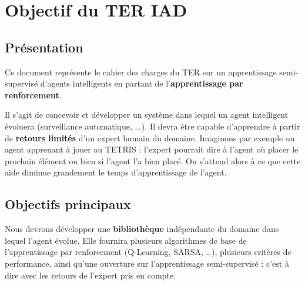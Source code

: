 \documentclass[a4paper,12pt]{article}
\begin{document}
  \begin{titlepage}
   \def\titletype{Cahier des charges}
   
  \end{titlepage}

  
  \clearpage

  \tableofcontents
  

  \clearpage
  
  \renewcommand{\labelitemi}{$\bullet$}
  \renewcommand{\labelitemii}{$\circ$}
  \renewcommand{\labelitemiii}{$\diamond$}
  \renewcommand{\labelitemiv}{$\ast$}
  
  \section{Objectif du TER IAD}
  \subsection{Présentation}
    Ce document représente le cahier des charges du TER sur un apprentissage semi-supervisé d'agents intelligents 
    en partant de l'\textbf{apprentissage par renforcement}.
	  
    Il s'agit de concevoir et développer un système dans lequel un agent intelligent évoluera (surveillance automatique, ...).
    Il devra être capable d'apprendre à partir de \textbf{retours limités} d'un expert humain du domaine. 
    Imaginons par exemple un agent apprenant à jouer au TETRIS : l'expert pourrait dire à l'agent où placer le 
    prochain élément ou bien si l'agent l'a bien placé. On s'attend alors à ce que cette aide diminue grandement le temps 
    d'apprentissage de l'agent.
    
  
  \subsection{Objectifs principaux}
	Nous devrons développer une \textbf{bibliothèque} indépendante du domaine dans lequel l'agent évolue. 
	Elle fournira plusieurs algorithmes de base de l'apprentissage par renforcement  (Q-Learning, SARSA, …), 
	plusieurs critères de performance, ainsi qu'une ouverture sur l'apprentissage semi-supervisé : 
	c'est à dire avec les retours de l'expert pris en compte. 
	
\end{document}

